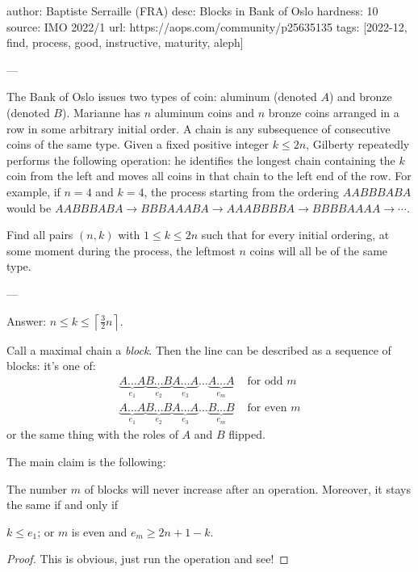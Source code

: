 author: Baptiste Serraille (FRA)
desc: Blocks in Bank of Oslo
hardness: 10
source: IMO 2022/1
url: https://aops.com/community/p25635135
tags: [2022-12, find, process, good, instructive, maturity, aleph]

---

The Bank of Oslo issues two types of coin: aluminum (denoted $A$) and bronze
(denoted $B$). Marianne has $n$ aluminum coins and $n$ bronze coins arranged in a
row in some arbitrary initial order.
A chain is any subsequence of consecutive coins of the same type.
Given a fixed positive integer $k \leq 2n$,
Gilberty repeatedly performs the following operation:
he identifies the longest chain containing the $k$ coin from the left
and moves all coins in that chain to the left end of the row.
For example, if $n=4$ and $k=4$, the process starting
from the ordering $AABBBABA$ would be
$AABBBABA \to BBBAAABA \to AAABBBBA \to BBBBAAAA \to \dotsb$.

Find all pairs $(n,k)$ with $1 \leq k \leq 2n$
such that for every initial ordering,
at some moment during the process,
the leftmost $n$ coins will all be of the same type.

---

Answer: $n \le k \le \left\lceil \frac 32 n \right\rceil$.

Call a maximal chain a \emph{block}.
Then the line can be described as a sequence of blocks: it's one of:
\begin{align*}
  \underbrace{A\dots A}_{e_1}
  \underbrace{B\dots B}_{e_2}
  \underbrace{A\dots A}_{e_3}
  \dots
  \underbrace{A\dots A}_{e_m} & \text{ for odd $m$} \\
  \underbrace{A\dots A}_{e_1}
  \underbrace{B\dots B}_{e_2}
  \underbrace{A\dots A}_{e_3}
  \dots
  \underbrace{B\dots B}_{e_m} & \text{ for even $m$}
\end{align*}
or the same thing with the roles of $A$ and $B$ flipped.

The main claim is the following:
\begin{claim*}
  The number $m$ of blocks will never increase after an operation.
  Moreover, it stays the same if and only if
  \begin{itemize}
    \ii $k \le e_1$; or
    \ii $m$ is even and $e_m \ge 2n+1-k$.
  \end{itemize}
\end{claim*}
\begin{proof}
  This is obvious, just run the operation and see!
\end{proof}

